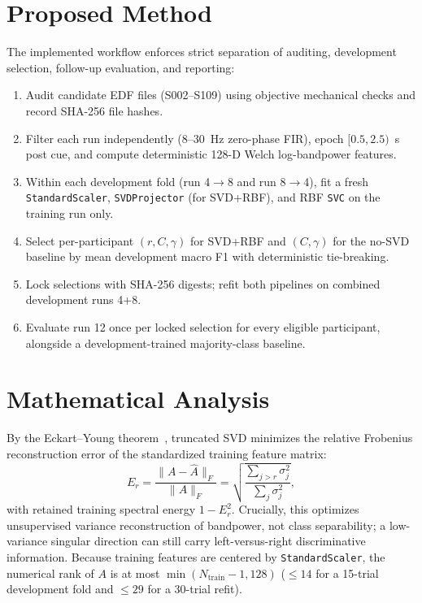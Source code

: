 \documentclass[conference]{IEEEtran}
\begin{document}
\section{Proposed Method}
The implemented workflow enforces strict separation of auditing, development
selection, follow-up evaluation, and reporting:
\begin{enumerate}
\item Audit candidate EDF files (S002--S109) using objective mechanical checks
  and record SHA-256 file hashes.
\item Filter each run independently (8--30~Hz zero-phase FIR), epoch $[0.5,2.5)$~s
  post cue, and compute deterministic 128-D Welch log-bandpower features.
\item Within each development fold (run 4$\to$8 and run 8$\to$4), fit a fresh
  \texttt{StandardScaler}, \texttt{SVDProjector} (for SVD+RBF), and RBF
  \texttt{SVC} on the training run only.
\item Select per-participant $(r,C,\gamma)$ for SVD+RBF and $(C,\gamma)$ for
  the no-SVD baseline by mean development macro F1 with deterministic tie-breaking.
\item Lock selections with SHA-256 digests; refit both pipelines on combined
  development runs 4+8.
\item Evaluate run 12 once per locked selection for every eligible participant,
  alongside a development-trained majority-class baseline.
\end{enumerate}

\section{Mathematical Analysis}
By the Eckart--Young theorem~\cite{ref11}, truncated SVD minimizes the relative
Frobenius reconstruction error of the standardized training feature matrix:
\begin{equation}
E_r=\frac{\|A-\widehat A\|_F}{\|A\|_F}
=\sqrt{\frac{\sum_{j>r}\sigma_j^2}{\sum_j\sigma_j^2}},
\end{equation}
with retained training spectral energy $1-E_r^2$. Crucially, this optimizes
unsupervised variance reconstruction of bandpower, not class separability; a
low-variance singular direction can still carry left-versus-right discriminative
information. Because training features are centered by \texttt{StandardScaler},
the numerical rank of $A$ is at most $\min(N_{\text{train}}-1,128)$ ($\le 14$
for a 15-trial development fold and $\le 29$ for a 30-trial refit).
\end{document}
